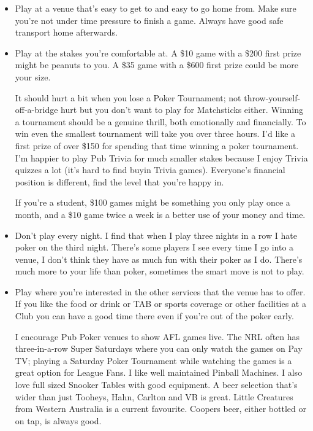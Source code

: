 \begin{itemize}

\item Play at a venue that's easy to get to and easy to go home
from. Make sure you're not under time pressure to finish a game.
Always have good safe transport home afterwards.

\item Play at the stakes you're comfortable at. A \$10
game with a \$200 first prize might be peanuts to you.
A \$35 game with a \$600 first prize could be more your size.

It should hurt a bit when you lose a Poker Tournament; not
throw-yourself-off-a-bridge hurt but you don't want to play for
Matchsticks either. Winning a tournament should be a genuine thrill,
both emotionally and financially. To win even the smallest tournament
will take you over three hours. I'd like a first prize of over \$150 for
spending that time winning a poker tournament. I'm happier to play Pub
Trivia for much smaller stakes because I enjoy Trivia quizzes a lot
(it's hard to find buyin Trivia games). Everyone's financial
position is different, find the level that you're happy in.

If you're a student, \$100 games might be something
you only play once a month, and a \$10 game twice a week is
a better use of your money and time.

\item Don't play every night. I find that when I play
three nights in a row I hate poker on the third
night. There's some players I see every time I go into a venue,
I don't think they have as much fun with their poker as I do.
There's much more to your life than poker, sometimes the smart
move is not to play.

\item Play where you're interested in the other services
that the venue has to offer. If you like the food or drink or
TAB or sports coverage or other facilities at a Club you can
have a good time there even if you're out of the poker early.

I encourage Pub Poker venues to show
AFL games live. The NRL often has three-in-a-row Super Saturdays
where you can only watch the games on Pay TV; playing a Saturday
Poker Tournament while watching the games is a great option
for League Fans. I like well maintained
Pinball Machines. I also love full sized Snooker Tables with good
equipment. A beer selection that's wider than
just Tooheys, Hahn, Carlton and VB is great. Little Creatures from Western
Australia is a current favourite. Coopers beer, either bottled
or on tap, is always good.


\end{itemize}
